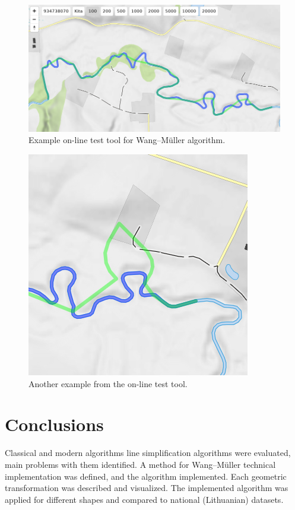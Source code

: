 \documentclass[a4paper]{article}
\newcommand{\WM}{Wang--M{\"u}ller}
\begin{document}
\begin{figure}[ht]
    \centering
    \includegraphics[width=\textwidth]{openmap-wm-good.png}
    \caption{Example on-line test tool for {\WM} algorithm.}
    \label{fig:openmap-wm-good}
\end{figure}

\begin{figure}[ht]
    \centering
    \includegraphics[width=.5\textwidth]{openmap-wm-bad.png}
    \caption{Another example from the on-line test tool.}
    \label{fig:openmap-wm-bad}
\end{figure}

\section{Conclusions}
\label{sec:conclusions}

Classical and modern algorithms line simplification algorithms were evaluated,
main problems with them identified. A method for {\WM} technical
implementation was defined, and the algorithm implemented. Each geometric
transformation was described and visualized. The implemented algorithm was
applied for different shapes and compared to national (Lithuanian) datasets.
\end{document}
